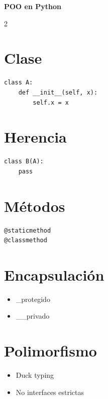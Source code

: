 \documentclass[a4paper,10pt]{article}
\begin{document}
\begin{center}
{\Large \textbf{POO en Python}}
\end{center}

\begin{multicols}{2}

\section*{Clase}
\begin{lstlisting}
class A:
    def __init__(self, x):
        self.x = x
\end{lstlisting}

\section*{Herencia}
\begin{lstlisting}
class B(A):
    pass
\end{lstlisting}

\section*{Métodos}
\begin{lstlisting}
@staticmethod
@classmethod
\end{lstlisting}

\section*{Encapsulación}
\begin{itemize}
\item \_protegido
\item \_\_privado
\end{itemize}

\section*{Polimorfismo}
\begin{itemize}
\item Duck typing
\item No interfaces estrictas
\end{itemize}

\end{multicols}
\end{document}
